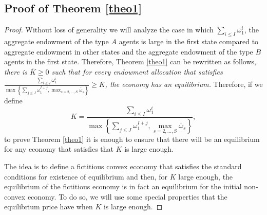 \documentclass[pdftex]{article}
\numberwithin{equation}{section}
\theoremstyle{th}
\newtheorem{proof lemma}{{Proof Lemma}.}
\theoremstyle{definition}
\begin{document}
{\subsection{Proof of Theorem \ref{theo1}}

\label{prooftheo1} \begin{proof} Without loss of generality we will
analyze the case in which $\sum_{i\leq{I}}\omega_{1}^{i}$,
the aggregate endowment of the type $A$ agents is large in the first
state compared to aggregate endowment in other states and the aggregate
endowment of the type $B$ agents in the first state. Therefore, Theorem \ref{theo1} can be rewritten as follows, \emph{there is $\overline{K}\geq0$ such that for every endowment allocation that satisfies $\frac{\sum_{i\leq{I}}\omega_{1}^{i}}{\max\left\{\sum_{j\leq{J}}\omega_{1}^{I+j},\max_{s=2,\dots,S}\overline{\omega}_s\right\}}\geq \overline{K}$, the economy has an equilibrium.} Therefore, if we define \begin{equation}\label{defK}K=\frac{\sum_{i\leq{I}}\omega_{1}^{i}}{\max\left\{\sum_{j\leq{J}}\omega_{1}^{I+j},\max_{s=2,\dots,S}\overline{\omega}_s\right\}},\end{equation} to prove Theorem \ref{theo1} it is enough to ensure that there will be an equilibrium for any economy that satisfies that $K$ is large enough.

The idea is to define a fictitious convex economy that satisfies the
standard conditions for existence of equilibrium and then, for $K$
large enough, the equilibrium of the fictitious economy is in fact
an equilibrium for the initial non-convex economy. To do so, we will
use some special properties that the equilibrium price have when $K$
is large enough.


\end{proof}}
\end{document}
